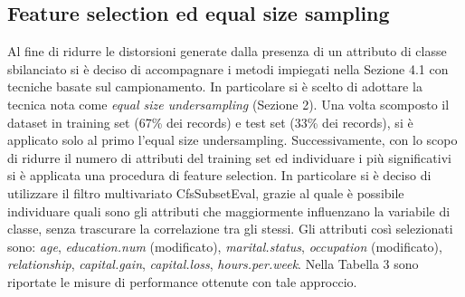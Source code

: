\documentclass[fleqn,10pt]{SelfArx}
\begin{document}
\subsection{Feature selection ed equal size sampling}
Al fine di ridurre le distorsioni generate dalla presenza di un attributo di classe sbilanciato si è deciso di accompagnare i metodi impiegati nella Sezione 4.1 con tecniche basate sul campionamento. In particolare si è scelto di adottare la tecnica nota come \textit{equal size undersampling} (Sezione 2). Una volta scomposto il dataset in training set (67\% dei records) e test set (33\% dei records), si è applicato solo al primo l'equal size undersampling. Successivamente, con lo scopo di ridurre il numero di attributi del training set ed individuare i più significativi si è applicata una procedura di feature selection. In particolare si è deciso di utilizzare il filtro multivariato CfsSubsetEval, grazie al quale è possibile individuare quali sono gli attributi che maggiormente influenzano la variabile di classe, senza trascurare la correlazione tra gli stessi. Gli attributi così selezionati sono: \textit{age}, \textit{education.num} (modificato), \textit{marital.status}, \textit{occupation} (modificato), \textit{relationship}, \textit{capital.gain}, \textit{capital.loss}, \textit{hours.per.week}.
Nella Tabella 3 sono riportate le misure di performance ottenute con tale approccio.
\begin{table}[h!]
\caption{Equal size sampling con CfsSubsetEval e holdout}
\label{table:holdout}
\end{table}
\end{document}
